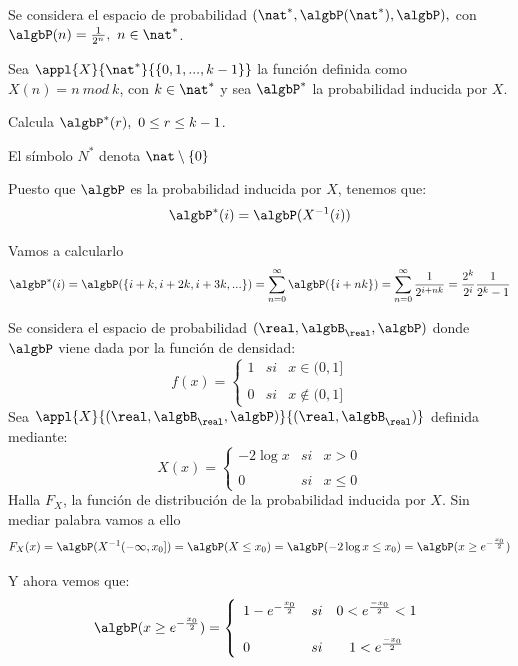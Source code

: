 \begin{problem}[7]
Se considera el espacio de probabilidad $(\nat^*, \algbP(\nat^*), \algbP),$ con $\algbP(n) = \frac{1}{2^n}, \ n \in \nat^*$.

Sea $\appl{X}{\nat^*}{\{0,1,...,k-1\}}$ la función definida como $X(n)=n \ mod \ k$, con $k \in \nat^*$ y sea $\algbP^*$ la probabilidad inducida por $X$.

Calcula $\algbP^*(r), \ 0 \leq r \leq k-1$.

\obs El símbolo $N^*$ denota $\nat \setminus \{0\}$

\solution
Puesto que $\algbP$ es la probabilidad inducida por $X$, tenemos que:
\[\algbP^*(i) = \algbP(X^{-1}(i))\]

Vamos a calcularlo
\[\algbP^*(i) = \algbP(\{i+k, i+2k, i+3k, ...\}) = \sum_{n=0}^{\infty} \algbP(\{i+nk\}) = \sum_{n=0}^{\infty} \frac{1}{2^{i+nk}} = \frac{2^k}{2^i}\frac{1}{2^k-1}\]

\end{problem}

\begin{problem}[8]
Se considera el espacio de probabilidad $(\real, \algbB_{\real}, \algbP)$ donde $\algbP$ viene dada por la función de densidad:
\[
f(x)= \left\{ \begin{array}{lcc}
             1 &   si  & x \in  (0, 1] \\
             \\ 0 &  si & x \notin (0, 1]
             \end{array}
   \right.
\]
Sea $\appl{X}{(\real, \algbB_{\real}, \algbP)}{(\real, \algbB_{\real})}$ definida mediante:
\[
X(x)= \left\{ \begin{array}{lcc}
             -2\log x &   si  & x >  0 \\
             \\ 0 &  si & x \leq 0
             \end{array}
   \right.
\]
Halla $F_X$, la función de distribución de la probabilidad inducida por $X$.
\solution
Sin mediar palabra vamos a ello
\[F_X(x) = \algbP(X^{-1}(-\infty, x_0]) = \algbP(X \leq x_0) = \algbP(-2\log x \leq x_0) = \algbP(x \geq e^{-\frac{x_0}{2}})\]

Y ahora vemos que:
\[
\algbP(x \geq e^{- \frac{x_0}{2}})= \left\{ \begin{array}{lcc}
             1-e^{-\frac{x_0}{2}} &   si  & 0 < e^{\frac{-x_0}{2}} <1 \\
             \\ 0 &  si & 1 < e^{\frac{-x_0}{2}}
             \end{array}
   \right.
\]
\end{problem}

